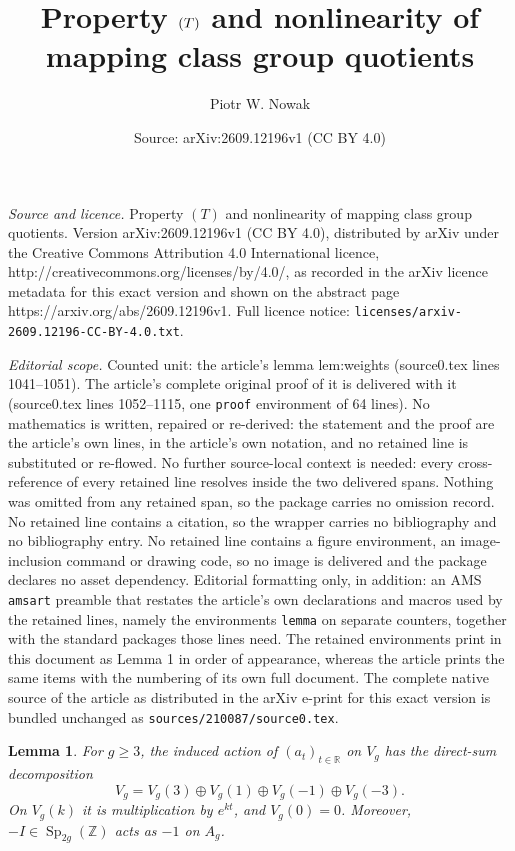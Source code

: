 \documentclass[10pt,a4paper]{amsart}
\title{Property \texorpdfstring{$\rt$}{(T)} and nonlinearity of mapping class group quotients}
\author{Piotr W. Nowak}
\date{Source: arXiv:2609.12196v1 (CC BY 4.0)}
\newcommand{\rt}{(T)}
\newtheorem{lemma}{Lemma}
\newcommand{\R}{\mathbb R}
\newcommand{\Sp}{\operatorname{Sp}}
\newcommand{\Z}{\mathbb Z}
\begin{document}
\maketitle

\noindent\emph{Source and licence.} Property \texorpdfstring{$\rt$}{(T)} and nonlinearity of mapping class group quotients. Version arXiv:2609.12196v1 (CC BY 4.0), distributed by arXiv under the Creative Commons Attribution 4.0 International licence, http://creativecommons.org/licenses/by/4.0/, as recorded in the arXiv licence metadata for this exact version and shown on the abstract page https://arxiv.org/abs/2609.12196v1. Full licence notice: \texttt{licenses/arxiv-2609.12196-CC-BY-4.0.txt}.\par\smallskip

\noindent\textit{Editorial scope.} Counted unit: the article's lemma lem:weights (source0.tex lines 1041--1051). The article's complete original proof of it is delivered with it (source0.tex lines 1052--1115, one \texttt{proof} environment of 64 lines). No mathematics is written, repaired or re-derived: the statement and the proof are the article's own lines, in the article's own notation, and no retained line is substituted or re-flowed.  No further source-local context is needed: every cross-reference of every retained line resolves inside the two delivered spans.  Nothing was omitted from any retained span, so the package carries no omission record.  No retained line contains a citation, so the wrapper carries no bibliography and no bibliography entry.  No retained line contains a figure environment, an image-inclusion command or drawing code, so no image is delivered and the package declares no asset dependency.  Editorial formatting only, in addition: an AMS \texttt{amsart} preamble that restates the article's own declarations and macros used by the retained lines, namely the environments \texttt{lemma} on separate counters, together with the standard packages those lines need.  The retained environments print in this document as Lemma 1 in order of appearance, whereas the article prints the same items with the numbering of its own full document.  The complete native source of the article as distributed in the arXiv e-print for this exact version is bundled unchanged as \texttt{sources/210087/source0.tex}.
\begin{lemma}
\label{lem:weights}
For \(g\ge3\), the induced action of \((a_t)_{t\in\R}\)
on \(V_g\) has the direct-sum decomposition
\[
 V_g=V_g(3)\oplus V_g(1)\oplus V_g(-1)\oplus V_g(-3).
\]
On \(V_g(k)\) it is multiplication by \(e^{kt}\), and
\(V_g(0)=0\). Moreover,
\(-I\in\Sp_{2g}(\Z)\) acts as \(-1\) on \(A_g\).
\end{lemma}
\end{document}
